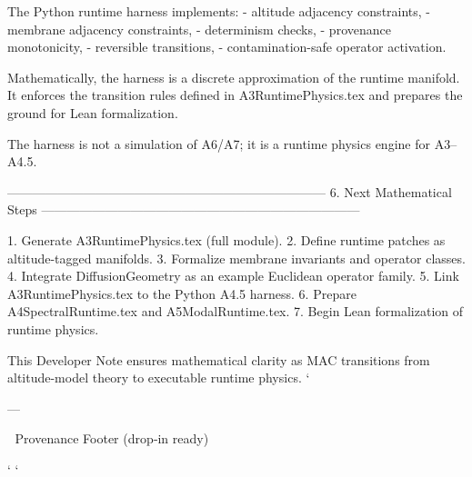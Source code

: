 The Python runtime harness implements:
- altitude adjacency constraints,
- membrane adjacency constraints,
- determinism checks,
- provenance monotonicity,
- reversible transitions,
- contamination-safe operator activation.

Mathematically, the harness is a discrete approximation of the runtime manifold.
It enforces the transition rules defined in A3RuntimePhysics.tex and prepares the
ground for Lean formalization.

The harness is not a simulation of A6/A7; it is a runtime physics engine for
A3–A4.5.

---------------------------------------------------------------------------
6. Next Mathematical Steps
---------------------------------------------------------------------------

1. Generate A3RuntimePhysics.tex (full module).
2. Define runtime patches as altitude-tagged manifolds.
3. Formalize membrane invariants and operator classes.
4. Integrate DiffusionGeometry as an example Euclidean operator family.
5. Link A3RuntimePhysics.tex to the Python A4.5 harness.
6. Prepare A4SpectralRuntime.tex and A5ModalRuntime.tex.
7. Begin Lean formalization of runtime physics.

This Developer Note ensures mathematical clarity as MAC transitions from
altitude-model theory to executable runtime physics.
`

---


🧭 Provenance Footer (drop‑in ready)

`
`

